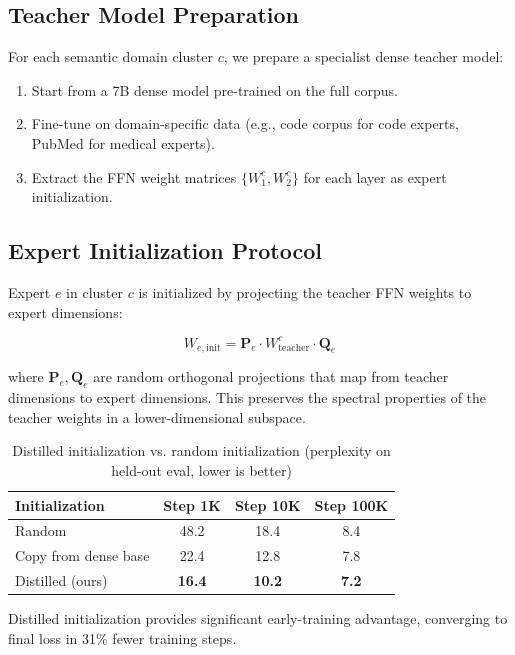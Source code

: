 \documentclass[11pt,a4paper]{article}
\begin{document}
\subsection{Teacher Model Preparation}

For each semantic domain cluster $c$, we prepare a specialist dense teacher model:
\begin{enumerate}
  \item Start from a 7B dense model pre-trained on the full corpus.
  \item Fine-tune on domain-specific data (e.g., code corpus for code experts, PubMed for medical experts).
  \item Extract the FFN weight matrices $\{W_1^c, W_2^c\}$ for each layer as expert initialization.
\end{enumerate}

\subsection{Expert Initialization Protocol}

Expert $e$ in cluster $c$ is initialized by projecting the teacher FFN weights to expert dimensions:

\begin{equation}
W_{e,\text{init}} = \mathbf{P}_e \cdot W^c_{\text{teacher}} \cdot \mathbf{Q}_e
\end{equation}

where $\mathbf{P}_e, \mathbf{Q}_e$ are random orthogonal projections that map from teacher dimensions to expert dimensions. This preserves the spectral properties of the teacher weights in a lower-dimensional subspace.

\begin{table}[H]
\centering
\caption{Distilled initialization vs. random initialization (perplexity on held-out eval, lower is better)}
\label{tab:distillation}
\begin{tabular}{lccc}
\toprule
Initialization & Step 1K & Step 10K & Step 100K \\
\midrule
Random & 48.2 & 18.4 & 8.4 \\
Copy from dense base & 22.4 & 12.8 & 7.8 \\
Distilled (ours) & \textbf{16.4} & \textbf{10.2} & \textbf{7.2} \\
\bottomrule
\end{tabular}
\end{table}

Distilled initialization provides significant early-training advantage, converging to final loss in 31\% fewer training steps.
\end{document}
